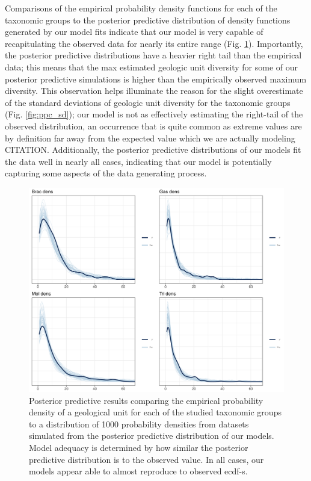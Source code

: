 \documentclass[12pt,letterpaper]{article}
\begin{document}
Comparisons of the empirical probability density functions for each of the taxonomic groups to the posterior predictive distribution of density functions generated by our model fits indicate that our model is very capable of recapitulating the observed data for nearly its entire range (Fig. \ref{fig:ppc_dens}). Importantly, the posterior predictive distributions have a heavier right tail than the empirical data; this means that the max estimated geologic unit diversity for some of our posterior predictive simulations is higher than the empirically observed maximum diversity. This observation helps illuminate the reason for the slight overestimate of the standard deviations of geologic unit diversity for the taxonomic groups (Fig. \ref{fig:ppc_sd}); our model is not as effectively estimating the right-tail of the observed distribution, an occurrence that is quite common as extreme values are by definition far away from the expected value which we are actually modeling CITATION. Additionally, the posterior predictive distributions of our models fit the data well in nearly all cases, indicating that our model is potentially capturing some aspects of the data generating process.

\begin{figure}[ht]
  \centering
  \includegraphics[width=\textwidth,height=0.5\textheight,keepaspectratio=true]{figure/ppc_dens_zoom}
  \caption{Posterior predictive results comparing the empirical probability density of a geological unit for each of the studied taxonomic groups to a distribution of 1000 probability densities from datasets simulated from the posterior predictive distribution of our models. Model adequacy is determined by how similar the posterior predictive distribution is to the observed value. In all cases, our models appear able to almost reproduce to observed ecdf-s.}
  \label{fig:ppc_dens}
\end{figure}
\end{document}
